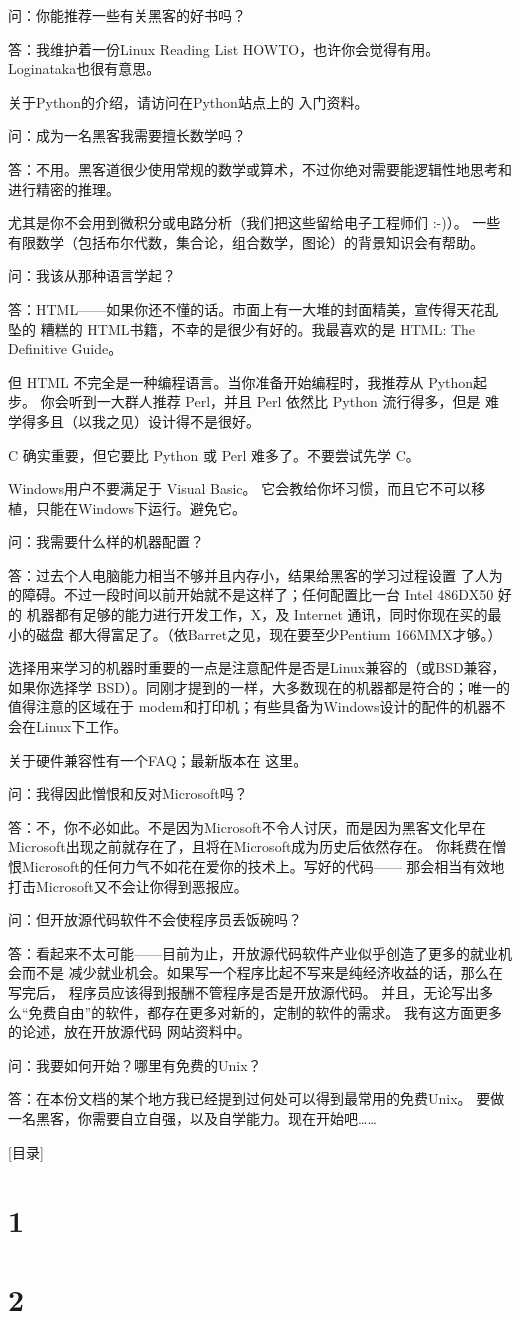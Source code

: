 \documentclass[a4paper,12pt,UTF8,twoside]{ctexbook}
\begin{document}
问：你能推荐一些有关黑客的好书吗？

答：我维护着一份Linux Reading List HOWTO，也许你会觉得有用。 Loginataka也很有意思。

关于Python的介绍，请访问在Python站点上的 入门资料。

问：成为一名黑客我需要擅长数学吗？

答：不用。黑客道很少使用常规的数学或算术，不过你绝对需要能逻辑性地思考和进行精密的推理。

尤其是你不会用到微积分或电路分析（我们把这些留给电子工程师们 :-)）。 一些有限数学（包括布尔代数，集合论，组合数学，图论）的背景知识会有帮助。

问：我该从那种语言学起？

答：HTML——如果你还不懂的话。市面上有一大堆的封面精美，宣传得天花乱坠的 糟糕的 HTML书籍，不幸的是很少有好的。我最喜欢的是 HTML: The Definitive Guide。

但 HTML 不完全是一种编程语言。当你准备开始编程时，我推荐从 Python起步。 你会听到一大群人推荐 Perl，并且 Perl 依然比 Python 流行得多，但是 难学得多且（以我之见）设计得不是很好。

C 确实重要，但它要比 Python 或 Perl 难多了。不要尝试先学 C。

Windows用户不要满足于 Visual Basic。 它会教给你坏习惯，而且它不可以移植，只能在Windows下运行。避免它。

问：我需要什么样的机器配置？

答：过去个人电脑能力相当不够并且内存小，结果给黑客的学习过程设置 了人为的障碍。不过一段时间以前开始就不是这样了；任何配置比一台 Intel 486DX50 好的 机器都有足够的能力进行开发工作，X，及 Internet 通讯，同时你现在买的最小的磁盘 都大得富足了。（依Barret之见，现在要至少Pentium 166MMX才够。）

选择用来学习的机器时重要的一点是注意配件是否是Linux兼容的（或BSD兼容，如果你选择学 BSD）。同刚才提到的一样，大多数现在的机器都是符合的；唯一的值得注意的区域在于 modem和打印机；有些具备为Windows设计的配件的机器不会在Linux下工作。

关于硬件兼容性有一个FAQ；最新版本在 这里。

问：我得因此憎恨和反对Microsoft吗？

答：不，你不必如此。不是因为Microsoft不令人讨厌，而是因为黑客文化早在 Microsoft出现之前就存在了，且将在Microsoft成为历史后依然存在。 你耗费在憎恨Microsoft的任何力气不如花在爱你的技术上。写好的代码—— 那会相当有效地打击Microsoft又不会让你得到恶报应。

问：但开放源代码软件不会使程序员丢饭碗吗？

答：看起来不太可能——目前为止，开放源代码软件产业似乎创造了更多的就业机会而不是 减少就业机会。如果写一个程序比起不写来是纯经济收益的话，那么在写完后， 程序员应该得到报酬不管程序是否是开放源代码。 并且，无论写出多么“免费自由”的软件，都存在更多对新的，定制的软件的需求。 我有这方面更多的论述，放在开放源代码 网站资料中。

问：我要如何开始？哪里有免费的Unix？

答：在本份文档的某个地方我已经提到过何处可以得到最常用的免费Unix。 要做一名黑客，你需要自立自强，以及自学能力。现在开始吧……

[目录]



\section{1}
\section{2}

\backmatter
\end{document}

